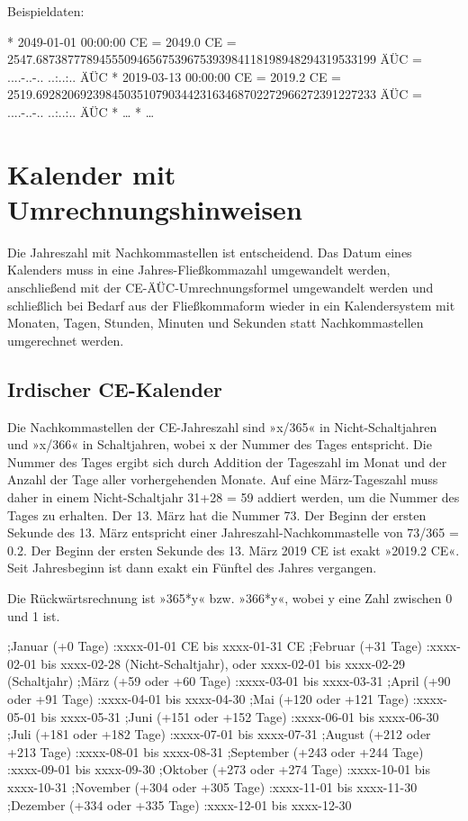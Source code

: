 Beispieldaten:

* 2049-01-01 00:00:00 CE = 2049.0 CE = 2547.687387778945550946567539675393984118198948294319533199 ÄÜC = ....-..-.. ..:..:.. ÄÜC
* 2019-03-13 00:00:00 CE = 2019.2 CE = 2519.692820692398450351079034423163468702272966272391227233 ÄÜC = ....-..-.. ..:..:.. ÄÜC
* …
* …


\section{Kalender mit Umrechnungshinweisen}

Die Jahreszahl mit Nachkommastellen ist entscheidend. Das Datum eines Kalenders muss in eine Jahres-Fließkommazahl umgewandelt werden, anschließend mit der CE-ÄÜC-Umrechnungsformel umgewandelt werden und schließlich bei Bedarf aus der Fließkommaform wieder in ein Kalendersystem mit Monaten, Tagen, Stunden, Minuten und Sekunden statt Nachkommastellen umgerechnet werden.

\subsection{Irdischer CE-Kalender}

Die Nachkommastellen der CE-Jahreszahl sind »x/365« in Nicht-Schaltjahren und »x/366« in Schaltjahren, wobei x der Nummer des Tages entspricht. Die Nummer des Tages ergibt sich durch Addition der Tageszahl im Monat und der Anzahl der Tage aller vorhergehenden Monate. Auf eine März-Tageszahl muss daher in einem Nicht-Schaltjahr 31+28 = 59 addiert werden, um die Nummer des Tages zu erhalten. Der 13. März hat die Nummer 73. Der Beginn der ersten Sekunde des 13. März entspricht einer Jahreszahl-Nachkommastelle von 73/365 = 0.2. Der Beginn der ersten Sekunde des 13. März 2019 CE ist exakt »2019.2 CE«. Seit Jahresbeginn ist dann exakt ein Fünftel des Jahres vergangen.

Die Rückwärtsrechnung ist »365*y« bzw. »366*y«, wobei y eine Zahl zwischen 0 und 1 ist.

;Januar (+0 Tage)
:xxxx-01-01 CE bis xxxx-01-31 CE
;Februar (+31 Tage)
:xxxx-02-01 bis xxxx-02-28 (Nicht-Schaltjahr), oder xxxx-02-01 bis xxxx-02-29 (Schaltjahr)
;März (+59 oder +60 Tage)
:xxxx-03-01 bis xxxx-03-31
;April (+90 oder +91 Tage)
:xxxx-04-01 bis xxxx-04-30
;Mai (+120 oder +121 Tage)
:xxxx-05-01 bis xxxx-05-31
;Juni (+151 oder +152 Tage)
:xxxx-06-01 bis xxxx-06-30
;Juli (+181 oder +182 Tage)
:xxxx-07-01 bis xxxx-07-31
;August (+212 oder +213 Tage)
:xxxx-08-01 bis xxxx-08-31
;September (+243 oder +244 Tage)
:xxxx-09-01 bis xxxx-09-30
;Oktober (+273 oder +274 Tage)
:xxxx-10-01 bis xxxx-10-31
;November (+304 oder +305 Tage)
:xxxx-11-01 bis xxxx-11-30
;Dezember (+334 oder +335 Tage)
:xxxx-12-01 bis xxxx-12-30

